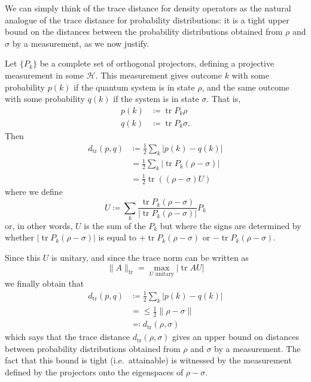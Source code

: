 \documentclass[fleqn]{article}
\renewcommand{\footnote}[1]{\en{#1}}
\begin{document}
We can simply think of the trace distance for density operators as the natural analogue of the trace distance for probability distributions: it is a tight upper bound on the distances between the probability distributions obtained from \(\rho\) and \(\sigma\) by a measurement, as we now justify.

Let \(\{P_k\}\) be a complete set of orthogonal projectors, defining a projective measurement in some \(\mathcal{H}\).
This measurement gives outcome \(k\) with some probability \(p(k)\) if the quantum system is in state \(\rho\), and the same outcome with some probability \(q(k)\) if the system is in state \(\sigma\).
That is,
\[
  \begin{aligned}
    p(k) &\coloneqq \operatorname{tr}P_k\rho
  \\q(k) &\coloneqq \operatorname{tr}P_k\sigma.
  \end{aligned}
\]
Then
\[
  \begin{aligned}
    d_{\operatorname{tr}}(p,q)
    &\coloneqq \frac{1}{2}\sum_k|p(k)-q(k)|
  \\&= \frac{1}{2}\sum_k|\operatorname{tr}P_k(\rho-\sigma)|
  \\&= \frac{1}{2}\operatorname{tr}((\rho-\sigma)U)
  \end{aligned}
\]
where we define
\[
  U\coloneqq \sum_k\frac{\operatorname{tr}P_k(\rho-\sigma)}{|\operatorname{tr}P_k(\rho-\sigma)|}P_k
\]
or, in other words, \(U\) is the sum of the \(P_k\) but where the signs are determined by whether \(|\operatorname{tr}P_k(\rho-\sigma)|\) is equal to \(+\operatorname{tr}P_k(\rho-\sigma)\) or \(-\operatorname{tr}P_k(\rho-\sigma)\).

Since this \(U\) is unitary, and since the trace norm can be written as\footnote{See Section \ref{more-operator-norms}.}
\[
  \|A\|_{\operatorname{tr}} = \max_{U\text{ unitary}}|\operatorname{tr}AU|
\]
we finally obtain that
\[
  \begin{aligned}
    d_{\operatorname{tr}}(p,q)
    &\coloneqq \frac{1}{2}\sum_k|p(k)-q(k)|
  \\&= \leqslant\frac{1}{2}\|\rho-\sigma\|
  \\&\eqqcolon d_{\operatorname{tr}}(\rho,\sigma)
  \end{aligned}
\]
which says that the trace distance \(d_{\operatorname{tr}}(\rho,\sigma)\) gives an upper bound on distances between probability distributions obtained from \(\rho\) and \(\sigma\) by a measurement.
The fact that this bound is tight (i.e.~attainable) is witnessed by the measurement defined by the projectors onto the eigenspaces of \(\rho-\sigma\).
\end{document}
